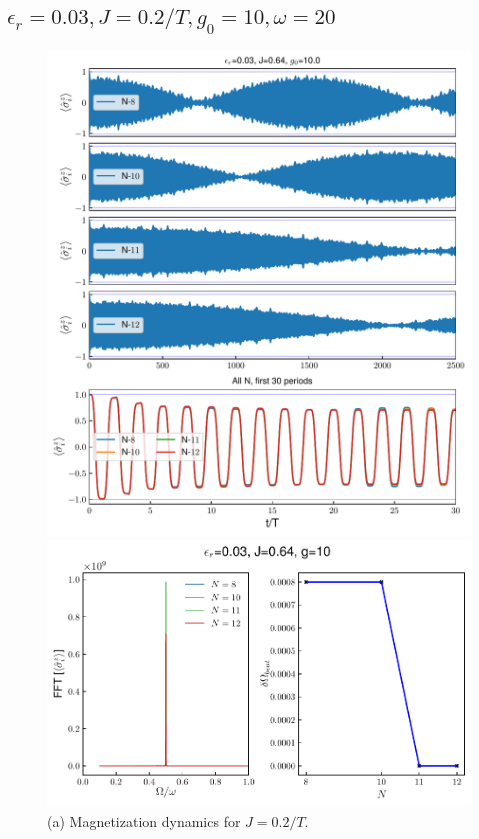 \documentclass[a4paper, 11pt]{article}
\begin{document}
\subsection{$\epsilon_r = 0.03, J = 0.2/T, g_0 = 10, \omega = 20$}
\begin{figure}[h!]
    \centering
    \begin{minipage}[t]{0.48\textwidth}
        \centering
        \includegraphics[width=\textwidth]{time_mag_epsilon_r0.03_J0.64_g10.0_allN.pdf}
        \caption*{(a) Magnetization dynamics for $J = 0.2/T$.}
    \end{minipage}
    \hfill
    \begin{minipage}[t]{0.48\textwidth}
        \centering
        \includegraphics[width=\textwidth]{DTC_mag_fft_beat_er=0.03_J=0.6366197723675814_g=10.0.pdf}

\end{minipage}
\end{figure}
\end{document}
